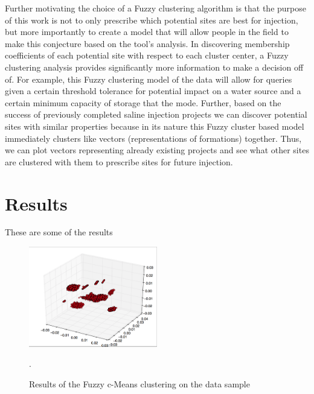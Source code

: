 \documentclass[a4paper, 12pt]{article}
\begin{document}
\par Further motivating the choice of a Fuzzy clustering algorithm is that the purpose of this work is not to only prescribe which potential sites are best for injection, but more importantly to create a model that will allow people in the field to make this conjecture based on the tool's analysis. In discovering membership coefficients of each potential site with respect to each cluster center, a Fuzzy clustering analysis provides significantly more information to make a decision off of. For example, this Fuzzy clustering model of the data will allow for queries given a certain threshold tolerance for potential impact on a water source and a certain minimum capacity of storage that the mode. Further, based on the success of previously completed saline injection projects we can discover potential sites with similar properties because in its nature this Fuzzy cluster based model immediately clusters like vectors (representations of formations) together. Thus, we can plot vectors representing already existing projects and see what other sites are clustered with them to prescribe sites for future injection. 



\section{Results}
These are some of the results

\begin{figure}%
  \centering
  \includegraphics[width=0.5\textwidth]{clusters}
  \caption{\label{clusters} Results of the Fuzzy c-Means clustering on the data sample}. 
\end{figure}
\end{document}
